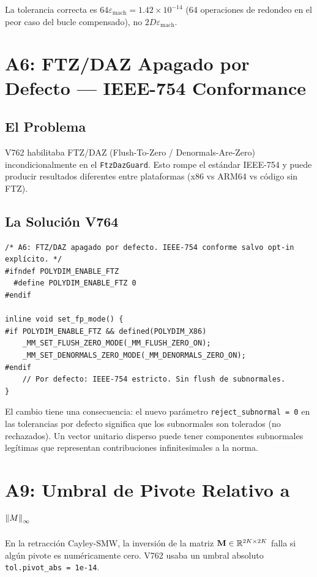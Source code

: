 La tolerancia correcta es $64\varepsilon_{\text{mach}} = 1.42 \times 10^{-14}$
(64 operaciones de redondeo en el peor caso del bucle compensado), no $2D\varepsilon_{\text{mach}}$.

\section{A6: FTZ/DAZ Apagado por Defecto --- IEEE-754 Conformance}

\subsection{El Problema}

V762 habilitaba FTZ/DAZ (Flush-To-Zero / Denormals-Are-Zero) incondicionalmente
en el \texttt{FtzDazGuard}. Esto rompe el estándar IEEE-754 y puede producir
resultados diferentes entre plataformas (x86 vs ARM64 vs código sin FTZ).

\subsection{La Solución V764}

\begin{lstlisting}[style=cppstyle, caption={FTZ/DAZ off by default --- A6}, label=lst:ftzdaz_off]
/* A6: FTZ/DAZ apagado por defecto. IEEE-754 conforme salvo opt-in explícito. */
#ifndef POLYDIM_ENABLE_FTZ
  #define POLYDIM_ENABLE_FTZ 0
#endif

inline void set_fp_mode() {
#if POLYDIM_ENABLE_FTZ && defined(POLYDIM_X86)
    _MM_SET_FLUSH_ZERO_MODE(_MM_FLUSH_ZERO_ON);
    _MM_SET_DENORMALS_ZERO_MODE(_MM_DENORMALS_ZERO_ON);
#endif
    // Por defecto: IEEE-754 estricto. Sin flush de subnormales.
}
\end{lstlisting}

El cambio tiene una consecuencia: el nuevo parámetro \texttt{reject\_subnormal = 0}
en las tolerancias por defecto significa que los subnormales son tolerados (no rechazados).
Un vector unitario disperso puede tener componentes subnormales legítimas que representan
contribuciones infinitesimales a la norma.

\section{A9: Umbral de Pivote Relativo a $\norm{M}_\infty$}

En la retracción Cayley-SMW, la inversión de la matriz $\mathbf{M} \in \mathbb{R}^{2K \times 2K}$
falla si algún pivote es numéricamente cero. V762 usaba un umbral absoluto
\texttt{tol.pivot\_abs = 1e-14}.

